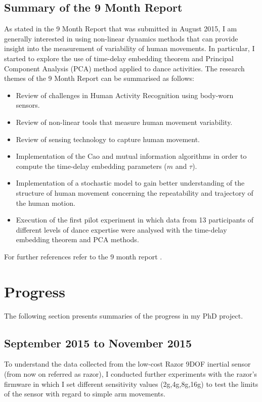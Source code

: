 \documentclass[9pt,journal,onecolumn,compsoc]{IEEEtran}
\begin{document}
\subsection{Summary of the 9 Month Report}
As stated in the 9 Month Report that was submitted in August 2015,
I am generally interested in using non-linear dynamics methods 
that can provide insight into the measurement of variability of human movements.
In particular, I started to explore the use of time-delay embedding theorem and 
Principal Component Analysis (PCA) method applied to dance activities. 
The research themes of the 9 Month Report can be summarised as follows:

\begin{itemize}
 \item Review of challenges in Human Activity Recognition using body-worn sensors.
 \item Review of non-linear tools that measure human movement variability.
 \item Review of sensing technology to capture human movement.
 \item Implementation of the Cao and mutual information algorithms in order 
    to compute the time-delay embedding parameters ($m$ and $\tau$).
 \item Implementation of a stochastic model to gain better understanding of the 
 structure of human movement concerning 
 the repeatability and trajectory of the human motion.
 \item Execution of the first pilot experiment in which data from 13 participants of different 
 levels of dance expertise were analysed with the time-delay embedding theorem and PCA methods.
\end{itemize}

For further references refer to the 9 month report \cite{mxochicale_9monthreport}.

\section{Progress}

The following section presents summaries of the progress in my PhD project.

\subsection{September 2015 to November 2015}

To understand the data collected from the low-cost Razor 9DOF inertial sensor
(from now on referred as razor),
I conducted further experiments with the razor's firmware in which I set 
different sensitivity values (2g,4g,8g,16g) to test the limits of the sensor
with regard to simple arm movements.
\end{document}
